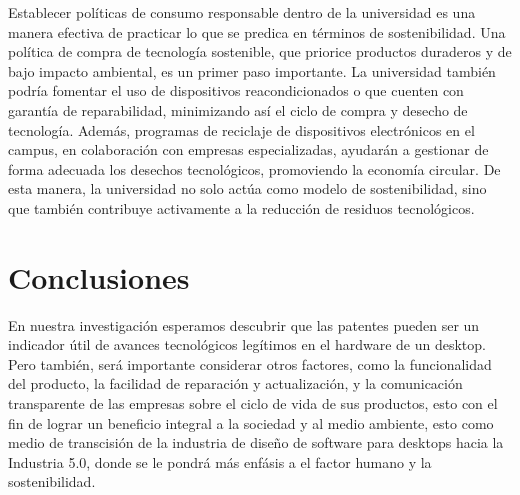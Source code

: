 \documentclass[10pt,journal,compsoc]{IEEEtran}
\begin{document}
Establecer políticas de consumo responsable dentro de la universidad es una manera efectiva de practicar lo que se predica en términos de sostenibilidad. Una política de compra de tecnología sostenible, que priorice productos duraderos y de bajo impacto ambiental, es un primer paso importante. La universidad también podría fomentar el uso de dispositivos reacondicionados o que cuenten con garantía de reparabilidad, minimizando así el ciclo de compra y desecho de tecnología. Además, programas de reciclaje de dispositivos electrónicos en el campus, en colaboración con empresas especializadas, ayudarán a gestionar de forma adecuada los desechos tecnológicos, promoviendo la economía circular. De esta manera, la universidad no solo actúa como modelo de sostenibilidad, sino que también contribuye activamente a la reducción de residuos tecnológicos.

\section{Conclusiones}
En nuestra investigación esperamos descubrir que las patentes pueden ser un indicador útil de avances tecnológicos legítimos en el hardware de un desktop. Pero también, será importante considerar otros factores, como la funcionalidad del producto, la facilidad de reparación y actualización, y la comunicación transparente de las empresas sobre el ciclo de vida de sus productos, esto con el fin de lograr un beneficio integral a la sociedad y al medio ambiente, esto como medio de transcisión de la industria de diseño de software para desktops hacia la Industria 5.0, donde se le pondrá más enfásis a el factor humano y la sostenibilidad. 

  \newpage
\fi




\end{document}
